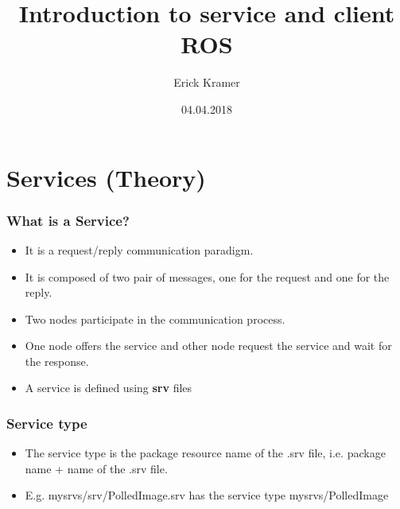 \documentclass{beamer}
\author[Kramer]{Erick Kramer}
\title{Introduction to service and client ROS}
\subtitle{}
\institute[HBRS]{Hochschule Bonn-Rhein-Sieg}
\date{04.04.2018}
\begin{document}
{
\begin{frame}
\titlepage
\end{frame}
}

%

\section{Services (Theory)}
	\begin{frame}
		\frametitle{What is a Service?}
		\begin{itemize}
			\item{It is a request/reply communication paradigm.}
			\item{It is composed of two pair of messages, one for the request and one for the reply.}
			\item{Two nodes participate in the communication process.}
			\item{One node offers the service and other node request the service and wait for the response.}
			\item{A service is defined using \textbf{srv} files}
			
		\end{itemize}
	\end{frame}
	\begin{frame}
		\frametitle{Service type}
		\begin{itemize}
			\item{The service type is the package resource name of the .srv file, i.e. package name + name of the .srv file.}
			\item{E.g. mysrvs/srv/PolledImage.srv has the service type mysrvs/PolledImage }
		\end{itemize}
	\end{frame}
\end{document}
